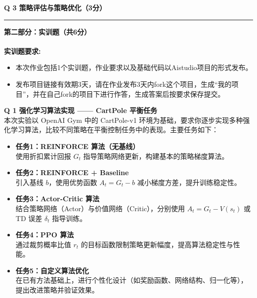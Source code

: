 \documentclass[a4paper, 11pt]{article}
\newenvironment{problem}[2][Q]
    { \begin{mdframed}[backgroundcolor=gray!20] \textbf{#1 #2} \\}
    {  \end{mdframed}}
\begin{document}
\begin{CJK}{UTF8}{gbsn}
\begin{problem}{3 策略评估与策略优化（3分）}
\end{problem}




\noindent\rule{7in}{1pt}
\textbf{第二部分：实训题（共6分）}
\\ \\
\textbf{实训题要求:}
\begin{itemize}
    \item 本次作业包括1个实训题，作业要求以及基础代码以Aistudio项目的形式发布。
    \item 发布项目链接有效期3天，请在作业发布3天内fork这个项目，生成``我的项目''，并在自己fork的项目下进行作答，生成答案后按要求保存提交。
\end{itemize}


\begin{problem}{1 强化学习算法实现 —— CartPole 平衡任务}

本次实验以 OpenAI Gym 中的 CartPole-v1 环境为基础，要求你逐步实现多种强化学习算法，比较不同策略在平衡控制任务中的表现。主要任务如下：

\begin{itemize}
    \item \textbf{任务1：REINFORCE 算法（无基线）} \\
    使用折扣累计回报 $G_t$ 指导策略网络更新，构建基本的策略梯度算法。

    \item \textbf{任务2：REINFORCE + Baseline} \\
    引入基线 $b$，使用优势函数 $A_t = G_t - b$ 减小梯度方差，提升训练稳定性。

    \item \textbf{任务3：Actor-Critic 算法} \\
    结合策略网络（Actor）与价值网络（Critic），分别使用 $A_t = G_t - V(s_t)$ 或 TD 误差 $\delta_t$ 指导训练。

    \item \textbf{任务4：PPO 算法} \\
    通过裁剪概率比值 $r_t$ 的目标函数限制策略更新幅度，提高算法稳定性与性能。

    \item \textbf{任务5：自定义算法优化} \\
    在已有方法基础上，进行个性化设计（如奖励函数、网络结构、归一化等），提出改进策略并验证效果。
\end{itemize}


\end{problem}
\end{CJK}
\end{document}
